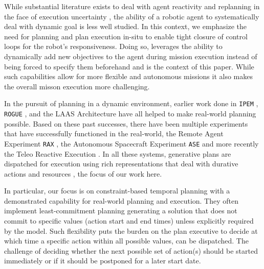While substantial literature exists to deal with agent reactivity and
replanning in the face of execution uncertainty , the ability of a robotic agent to systematically deal with
dynamic goal is less well studied. In this context, we emphasize the
need for planning and plan execution in-situ to enable tight closure
of control loops for the robot's responsiveness.
Doing so, leverages the ability to dynamically add new objectives to
the agent during mission execution instead of being forced to specify
them beforehand and is the context of this paper.  While such
capabilities allow for more flexible and autonomous missions it also
makes the overall misson execution more challenging.

In the pursuit of planning in a dynamic environment, earlier work done
in \texttt{IPEM} \cite{AmbrosIngerson88}, \texttt{ROGUE}
\cite{Haigh98}, and the LAAS Architecture \cite{alami:1998p820} have
all helped to make real-world planning possible. Based on these past
successes, there have been multiple experiments that have successfully
functioned in the real-world, the Remote Agent Experiment \texttt{RAX}
\cite{mus98}, the Autonomous Spacecraft Experiment \texttt{ASE}
\cite{chien99} and more recently the Teleo Reactive Execution \rxe
\cite{mcgann08b,py10}. In all these systems, generative plans are
dispatched for execution using rich representations that deal with
durative actions and resources \cite{lemai04}, the focus of our work
here.

In particular, our focus is on constraint-based temporal planning
\cite{frank2003} with a demonstrated capability for real-world
planning and execution.
They often implement least-commitment planning generating a solution
that does not commit to specific values (\eg action start and end
times) unless explicitly required by the model. Such flexibility puts
the burden on the plan executive to decide at which time a specific
action within all possible values, can be dispatched. 
The challenge of deciding whether the next possible set of action(s)
should be started immediately or if it should be postponed for a later
start date.

